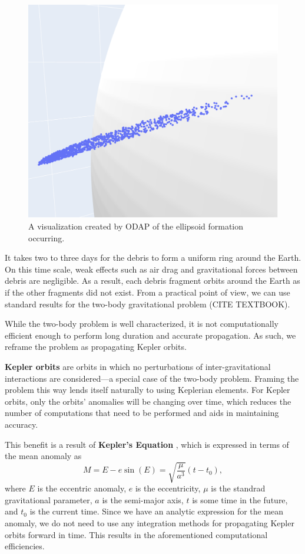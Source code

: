 \documentclass[a4paper, 12pt]{article}
\newcommand{\lindex}[1]{%
	\lowercase{\def\temp{#1}}%
	\expandafter\index\expandafter{\temp}%
}
\newcommand{\boldindex}[1]{%
	\textbf{#1}\lindex{#1}%
}
\begin{document}
\begin{figure}[h]
	\centering
	\includegraphics[scale=0.35]{ellisoid_phase}
	\caption{A visualization created by ODAP of the ellipsoid formation occurring.}
	\label{fig:ellipsoid}
\end{figure}

It takes two to three days for the debris to form a uniform ring around the Earth. On this time scale, weak effects such as air drag and gravitational forces between debris are negligible. As a result, each debris fragment orbits around the Earth as if the other fragments did not exist. From a practical point of view, we can use standard results for the two-body gravitational problem (CITE TEXTBOOK).

While the two-body problem is well characterized, it is not computationally efficient enough to perform long duration and accurate propagation. As such, we reframe the problem as propagating Kepler orbits.

\boldindex{Kepler orbits} are orbits in which no perturbations of inter-gravitational interactions are considered---a special case of the two-body problem. Framing the problem this way lends itself naturally to using Keplerian elements. For Kepler orbits, only the orbits' anomalies will be changing over time, which reduces the number of computations that need to be performed and aids in maintaining accuracy.

This benefit is a result of \boldindex{Kepler's Equation}, which is expressed in terms of the mean anomaly as
\begin{equation}
	M = E - e\sin(E) = \sqrt{\frac{\mu}{a^3}}\left(t - t_0\right),
\end{equation}
where $E$ is the eccentric anomaly, $e$ is the eccentricity, $\mu$ is the standrad gravitational parameter, $a$ is the semi-major axis, $t$ is some time in the future, and $t_0$ is the current time. Since we have an analytic expression for the mean anomaly, we do not need to use any integration methods for propagating Kepler orbits forward in time. This results in the aforementioned computational efficiencies.
\end{document}
